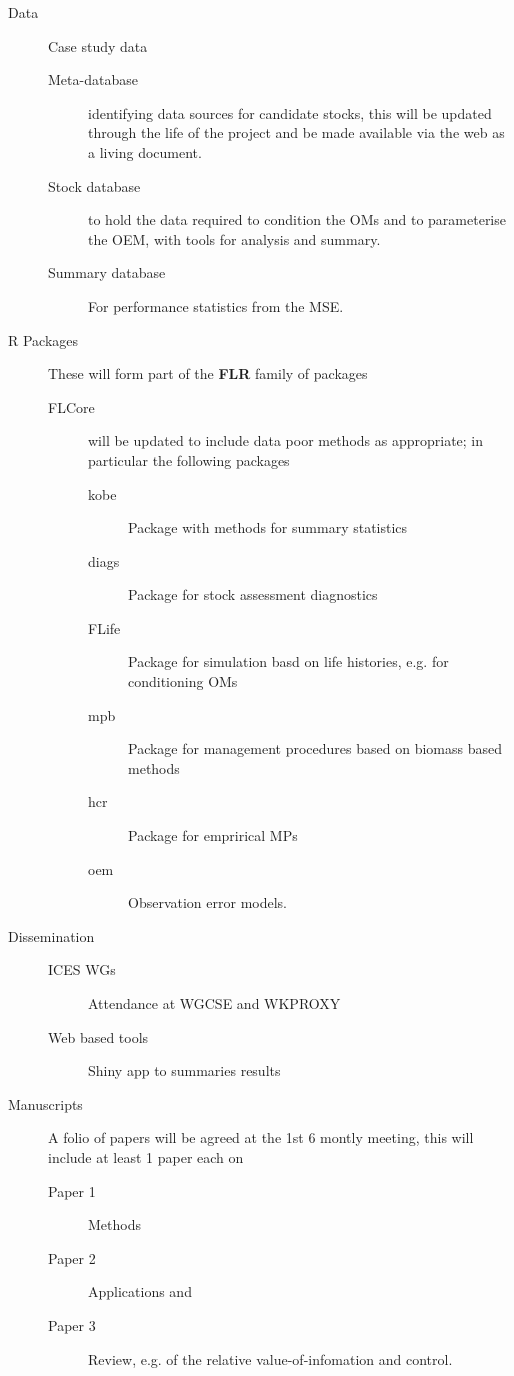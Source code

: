 \documentclass[a4paper, 10pt]{article}
\begin{document}
\begin{description}
 \item[Data] Case study data
    \begin{description}
    \item[Meta-database] identifying data sources for candidate stocks, this will be updated through the life of the project and be made available via the web as a living document.
    \item[Stock database] to hold the data required to condition the OMs and to parameterise the OEM, with tools for analysis and summary.
    \item[Summary database] For performance statistics from the MSE.
    \end{description}
  \item[R Packages] These will form part of the \textbf{FLR} family of packages
    \begin{description}
    \item[FLCore] will be updated to include data poor methods as appropriate; in particular the following packages 
    \begin{description}
    \item[kobe] Package with methods for summary statistics
    \item[diags] Package for stock assessment diagnostics
    \item[FLife] Package for simulation basd on life histories, e.g. for conditioning OMs
    \item[mpb] Package for management procedures based on biomass based methods
    \item[hcr] Package for emprirical MPs 
    \item[oem] Observation error models. 
    \end{description}
  \end{description}
 \item[Dissemination] 
    \begin{description}
    \item[ICES WGs] Attendance at WGCSE and WKPROXY
    \item[Web based tools] Shiny app to summaries results
  \end{description}
 \item[Manuscripts] A folio of papers will be agreed at the 1st 6 montly meeting, this will include at least 1 paper each on 
    \begin{description}
    \item[Paper 1] Methods
    \item[Paper 2] Applications and
    \item[Paper 3] Review, e.g. of the relative value-of-infomation and control.
    \end{description}
\end{description}
\end{document}
